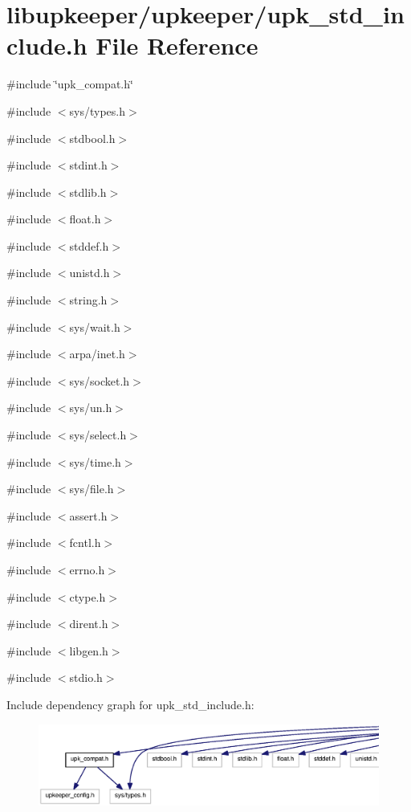 \section{libupkeeper/upkeeper/upk\_\-std\_\-include.h File Reference}
\label{upk__std__include_8h}
{\ttfamily \#include \char`\"{}upk\_\-compat.h\char`\"{}}\par
{\ttfamily \#include $<$sys/types.h$>$}\par
{\ttfamily \#include $<$stdbool.h$>$}\par
{\ttfamily \#include $<$stdint.h$>$}\par
{\ttfamily \#include $<$stdlib.h$>$}\par
{\ttfamily \#include $<$float.h$>$}\par
{\ttfamily \#include $<$stddef.h$>$}\par
{\ttfamily \#include $<$unistd.h$>$}\par
{\ttfamily \#include $<$string.h$>$}\par
{\ttfamily \#include $<$sys/wait.h$>$}\par
{\ttfamily \#include $<$arpa/inet.h$>$}\par
{\ttfamily \#include $<$sys/socket.h$>$}\par
{\ttfamily \#include $<$sys/un.h$>$}\par
{\ttfamily \#include $<$sys/select.h$>$}\par
{\ttfamily \#include $<$sys/time.h$>$}\par
{\ttfamily \#include $<$sys/file.h$>$}\par
{\ttfamily \#include $<$assert.h$>$}\par
{\ttfamily \#include $<$fcntl.h$>$}\par
{\ttfamily \#include $<$errno.h$>$}\par
{\ttfamily \#include $<$ctype.h$>$}\par
{\ttfamily \#include $<$dirent.h$>$}\par
{\ttfamily \#include $<$libgen.h$>$}\par
{\ttfamily \#include $<$stdio.h$>$}\par
Include dependency graph for upk\_\-std\_\-include.h:
\nopagebreak
\begin{figure}[H]
\begin{center}
\leavevmode
\includegraphics[width=400pt]{upk__std__include_8h__incl}
\end{center}
\end{figure}
